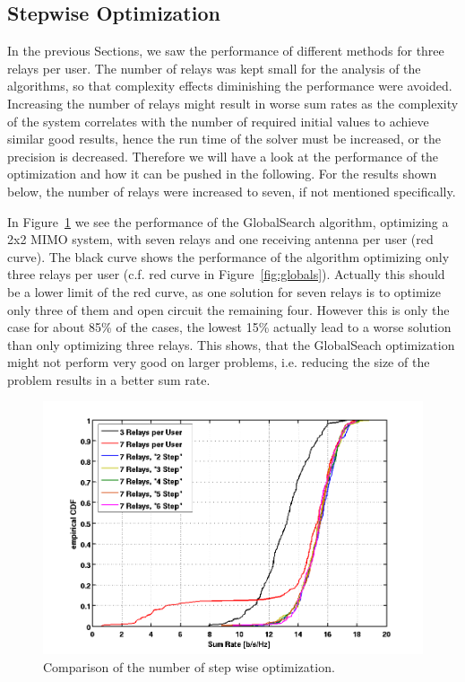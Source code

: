\subsection{Stepwise Optimization}
\label{sec:stepwise}
In the previous Sections, we saw the performance of different methods for three relays per user.
The number of relays was kept small for the analysis of the algorithms, so that complexity effects diminishing the performance were avoided.
Increasing the number of relays might result in worse sum rates as the complexity of the system correlates with the number of required initial values to achieve similar good results, hence the run time of the solver must be increased, or the precision is decreased.
Therefore we will have a look at the performance of the optimization and how it can be pushed in the following.
For the results shown below, the number of relays were increased to seven, if not mentioned specifically.

In Figure~\ref{fig:nrel7} we see the performance of the GlobalSearch algorithm, optimizing a 2x2 MIMO system, with seven relays and one receiving antenna per user (red curve).
The black curve shows the performance of the algorithm optimizing only three relays per user (c.f.  red curve in Figure~\ref{fig:globals}).
Actually this should be a lower limit of the red curve, as one solution for seven relays is to optimize only three of them and open circuit the remaining four.
However this is only the case for about 85\% of the cases, the lowest 15\% actually lead to a worse solution than only optimizing three relays.
This shows, that the GlobalSeach optimization might not perform very good on larger problems, i.e. reducing the size of the problem results in a better sum rate.

\begin{figure}[h]
\centering
  \includegraphics[width=0.7\linewidth]{images/Relstepcomparison_edited.png}
\caption{Comparison of the number of step wise optimization.}
\label{fig:nrel7}
\end{figure}

